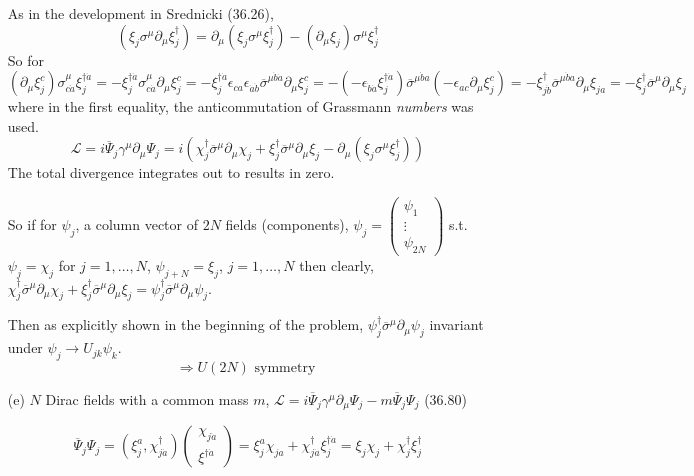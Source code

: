 \documentclass[twoside]{amsart}
\begin{document}
\begin{itemize}
As in the development in Srednicki (36.26),
\[
( \xi_j \sigma^{\mu} \partial_{\mu} \xi_j^{\dag} ) = \partial_{\mu} ( \xi_j \sigma^{\mu} \xi_j^{\dag}) - (\partial_{\mu} \xi_j ) \sigma^{\mu} \xi_j^{\dag}
\]
So for
\[
(\partial_{\mu} \xi_j^c) \sigma_{c\dot{a}}^{\mu} \xi_j^{\dag \dot{a}} = - \xi_j^{\dag \dot{a} } \sigma^{\mu}_{c\dot{a}} \partial_{\mu} \xi_j^c = - \xi_j^{\dag \dot{a}} \epsilon_{ca} \epsilon_{\dot{a} \dot{b}} \overline{\sigma}^{\mu \dot{b} \dot{a} } \partial_{\mu} \xi_j^c = - ( - \epsilon_{\dot{b} \dot{a}} \xi_j^{\dag \dot{a}} ) \overline{\sigma}^{\mu \dot{b} a} ( - \epsilon_{ac} \partial_{\mu} \xi_j^c ) = - \xi_{j \dot{b}}^{\dag} \overline{\sigma}^{\mu \dot{b} a}  \partial_{\mu} \xi_{ja} = - \xi_j^{\dag} \overline{\sigma}^{\mu} \partial_{\mu} \xi_j 
\]
where in the first equality, the anticommutation of Grassmann \emph{numbers} was used.  
\[
\mathcal{L} = i \overline{\Psi}_j \gamma^{\mu} \partial_{\mu} \Psi_j = i ( \chi_j^{\dag} \overline{\sigma}^{\mu} \partial_{\mu} \chi_j + \xi_j^{\dag} \overline{\sigma}^{\mu} \partial_{\mu} \xi_j - \partial_{\mu} ( \xi_j \sigma^{\mu} \xi_j^{\dag} ) ) 
\]
The total divergence integrates out to results in zero.  

So if for $\psi_j$, a column vector of $2N$ fields (components), $\psi_j = \left( \begin{matrix} \psi_1 \\ \vdots \\ \psi_{2N} \end{matrix} \right)$ s.t. $\psi_j = \chi_j$ for $j=1, \dots , N$, $\psi_{j+N} = \xi_j$, $j=1, \dots, N$ then clearly, $\chi_j^{\dag} \overline{\sigma}^{\mu} \partial_{\mu} \chi_j + \xi_j^{\dag} \overline{\sigma}^{\mu} \partial_{\mu} \xi_j = \psi_j^{\dag} \overline{\sigma}^{\mu} \partial_{\mu} \psi_j$.  

Then as explicitly shown in the beginning of the problem, $\psi_j^{\dag} \overline{\sigma}^{\mu} \partial_{\mu} \psi_j$ invariant under $\psi_j \to U_{jk} \psi_k$.  
\[
\Longrightarrow \boxed{ U(2N) \text{ symmetry }}
\]
\item[(e)] $N$ Dirac fields with a common mass $m$, $\mathcal{L} = i \overline{\Psi}_j \gamma^{\mu} \partial_{\mu} \Psi_j - m \overline{\Psi}_j \Psi_j$ (36.80)

\[
\overline{\Psi}_j \Psi_j = ( \xi_j^a, \chi_{j \dot{a}}^{\dag} ) \left( \begin{matrix} \chi_{j\dot{a}} \\ \xi^{\dag \dot{a}} \end{matrix} \right) = \xi_j^a \chi_{ja} + \chi_{j \dot{a}}^{\dag} \xi_j^{\dag \dot{a}} = \xi_j \chi_j + \chi_j^{\dag} \xi_j^{\dag}
\]


\end{itemize}
\end{document}
